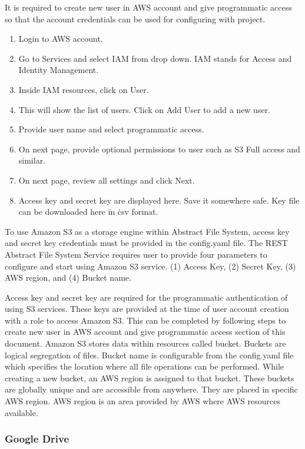 It is required to create new user in AWS account and give 
programmatic access so that the account credentials can be 
used for configuring with project.

\begin{enumerate}
    \item Login to AWS account.
    \item Go to Services and select IAM from drop down. 
	IAM stands for Access and Identity Management.
    \item Inside IAM resources, click on User.
    \item This will show the list of users. Click on Add User to add a new 
user.
    \item Provide user name and select programmatic access.
    \item On next page, provide optional permissions to user such as S3 Full
access and similar.
    \item On next page, review all settings and click Next.
    \item Access key and secret key are displayed here. Save it somewhere safe.
Key file can be downloaded here in \.csv format.
\end{enumerate}


To use Amazon S3 as a storage engine within Abstract File System,
access key and secret key credentials must be provided in the
config.yaml file. The REST Abstract File System Service requires user
to provide four parameters to configure and start using Amazon S3
service.  (1) Access Key, (2) Secret Key, (3) AWS region, and (4)
Bucket name.


Access key and secret key are required for the programmatic
authentication of using S3 services. These keys are provided at the
time of user account creation with a role to access Amazon S3.  This
can be completed by following steps to create new user in AWS account
and give programmatic access section of this document.
Amazon S3 stores data within resources called bucket. Buckets are logical
segregation of files. Bucket name is configurable from the config.yaml file
which specifies the location where all file operations can be performed. 
While creating a new bucket, an AWS region is assigned to that bucket. These 
buckets are globally unique and are accessible from anywhere. They are
placed in specific AWS region. AWS region is an area provided by AWS where
AWS resources available.

\subsubsection{Google Drive}



